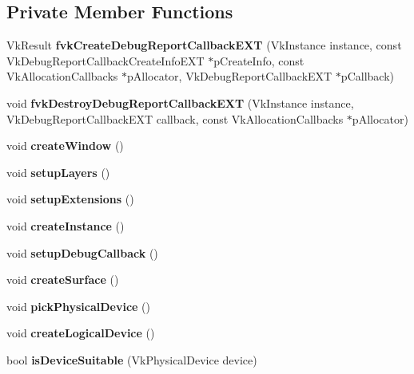 \subsection*{Private Member Functions}
\begin{DoxyCompactItemize}
\item 
\mbox{\label{classflounder_1_1display_a7fbc07b2c5b03bc9c6bbb1e0d1c62d1c}} 
Vk\+Result {\bfseries fvk\+Create\+Debug\+Report\+Callback\+E\+XT} (Vk\+Instance instance, const Vk\+Debug\+Report\+Callback\+Create\+Info\+E\+XT $\ast$p\+Create\+Info, const Vk\+Allocation\+Callbacks $\ast$p\+Allocator, Vk\+Debug\+Report\+Callback\+E\+XT $\ast$p\+Callback)
\item 
\mbox{\label{classflounder_1_1display_a408a98eb555ec13d1f4466031f0429d3}} 
void {\bfseries fvk\+Destroy\+Debug\+Report\+Callback\+E\+XT} (Vk\+Instance instance, Vk\+Debug\+Report\+Callback\+E\+XT callback, const Vk\+Allocation\+Callbacks $\ast$p\+Allocator)
\item 
\mbox{\label{classflounder_1_1display_a05d32e34277ea53c4806cbd39c9e9f8a}} 
void {\bfseries create\+Window} ()
\item 
\mbox{\label{classflounder_1_1display_ae102aa0f100b76cee532caadf93db4db}} 
void {\bfseries setup\+Layers} ()
\item 
\mbox{\label{classflounder_1_1display_af2dad0af11cc41bafd45e1b3f6df3f35}} 
void {\bfseries setup\+Extensions} ()
\item 
\mbox{\label{classflounder_1_1display_ada8b12da706b15bd350fd9761c53b872}} 
void {\bfseries create\+Instance} ()
\item 
\mbox{\label{classflounder_1_1display_a9537487ef93331f0b3a08a03aa829d3b}} 
void {\bfseries setup\+Debug\+Callback} ()
\item 
\mbox{\label{classflounder_1_1display_a52ec7ad8f28b4da0a63945ef1d415fbb}} 
void {\bfseries create\+Surface} ()
\item 
\mbox{\label{classflounder_1_1display_a63ffc8b5e35da956482bc8532eb0cbc1}} 
void {\bfseries pick\+Physical\+Device} ()
\item 
\mbox{\label{classflounder_1_1display_a9d0386b8e915040d8c8c0e8a51762a23}} 
void {\bfseries create\+Logical\+Device} ()
\item 
\mbox{\label{classflounder_1_1display_afd3c8a4fedbe187d9fc612b8badda439}} 
bool {\bfseries is\+Device\+Suitable} (Vk\+Physical\+Device device)
\end{DoxyCompactItemize}
